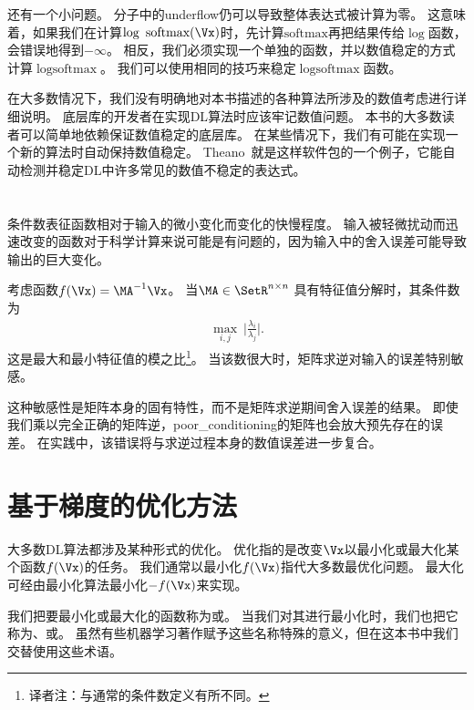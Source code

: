 还有一个小问题。
分子中的\gls{underflow}仍可以导致整体表达式被计算为零。
这意味着，如果我们在计算$\log ~\text{softmax}(\Vx)$时，先计算$\text{softmax}$再把结果传给$\log$函数，会错误地得到$-\infty$。
相反，我们必须实现一个单独的函数，并以数值稳定的方式计算$\log \text{softmax}$。
我们可以使用相同的技巧来稳定$\log \text{softmax}$函数。

在大多数情况下，我们没有明确地对本书描述的各种算法所涉及的数值考虑进行详细说明。
底层库的开发者在实现\gls{DL}算法时应该牢记数值问题。
本书的大多数读者可以简单地依赖保证数值稳定的底层库。
在某些情况下，我们有可能在实现一个新的算法时自动保持数值稳定。
Theano~\citep{bergstra+al:2010-scipy,Bastien-2012}就是这样软件包的一个例子，它能自动检测并稳定\gls{DL}中许多常见的数值不稳定的表达式。


\section{}
\label{sec:poor_conditioning}

条件数表征函数相对于输入的微小变化而变化的快慢程度。
输入被轻微扰动而迅速改变的函数对于科学计算来说可能是有问题的，因为输入中的舍入误差可能导致输出的巨大变化。

考虑函数$f(\Vx) = \MA^{-1} \Vx$。
当$\MA \in \SetR^{n \times n}$ 具有特征值分解时，其条件数为
\begin{align}
 \underset{i,j}{\max}~ \Bigg| \frac{\lambda_i}{ \lambda_j} \Bigg|.
\end{align}
这是最大和最小特征值的模之比\footnote{译者注：与通常的条件数定义有所不同。}。
当该数很大时，矩阵求逆对输入的误差特别敏感。

这种敏感性是矩阵本身的固有特性，而不是矩阵求逆期间舍入误差的结果。
即使我们乘以完全正确的矩阵逆，\gls{poor_conditioning}的矩阵也会放大预先存在的误差。
在实践中，该错误将与求逆过程本身的数值误差进一步复合。



\section{基于梯度的优化方法}
\label{sec:gradient_based_optimization}

大多数\gls{DL}算法都涉及某种形式的优化。
优化指的是改变$\Vx$以最小化或最大化某个函数$f(\Vx)$的任务。
我们通常以最小化$f(\Vx)$指代大多数最优化问题。
最大化可经由最小化算法最小化$-f(\Vx)$来实现。

我们把要最小化或最大化的函数称为或。
当我们对其进行最小化时，我们也把它称为、或。
虽然有些机器学习著作赋予这些名称特殊的意义，但在这本书中我们交替使用这些术语。

